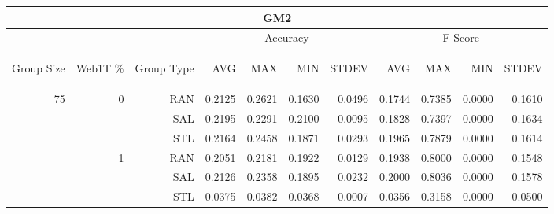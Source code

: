 \begin{center}
\begin{table}[htbp]
\begin{tabular}{ | r | r | r | r | r | r | r | r | r | r | r |}
\hline
\multicolumn{11}{|c|}{GM2}\\
\hline
 & & & \multicolumn{4}{|c|}{Accuracy} & \multicolumn{4}{|c|}{F-Score}\\ \cline{4-11}
\begin{sideways}Group Size\end{sideways} & \begin{sideways}Web1T \%\end{sideways} & \begin{sideways}Group Type\end{sideways} & \begin{sideways}AVG\end{sideways} & \begin{sideways}MAX\end{sideways} & \begin{sideways}MIN\end{sideways} & \begin{sideways}STDEV\end{sideways} & \begin{sideways}AVG\end{sideways} & \begin{sideways}MAX\end{sideways} & \begin{sideways}MIN\end{sideways} & \begin{sideways}STDEV\end{sideways}\\
\hline
\multirow{18}{*}{75}
 & \multirow{3}{*}{0} & RAN & 0.2125 & 0.2621 & 0.1630 & 0.0496 & 0.1744 & 0.7385 & 0.0000 & 0.1610\\ \cline{3-11}
 &   & SAL & 0.2195 & 0.2291 & 0.2100 & 0.0095 & 0.1828 & 0.7397 & 0.0000 & 0.1634\\ \cline{3-11}
 &   & STL & 0.2164 & 0.2458 & 0.1871 & 0.0293 & 0.1965 & 0.7879 & 0.0000 & 0.1614\\ \cline{2-11}
 & \multirow{3}{*}{1} & RAN & 0.2051 & 0.2181 & 0.1922 & 0.0129 & 0.1938 & 0.8000 & 0.0000 & 0.1548\\ \cline{3-11}
 &   & SAL & 0.2126 & 0.2358 & 0.1895 & 0.0232 & 0.2000 & 0.8036 & 0.0000 & 0.1578\\ \cline{3-11}
 &   & STL & 0.0375 & 0.0382 & 0.0368 & 0.0007 & 0.0356 & 0.3158 & 0.0000 & 0.0500\\ \cline{2-11}

\end{tabular}
\end{table}
\end{center}
